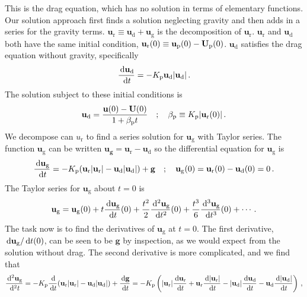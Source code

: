 This is the drag equation, which has no solution in terms of elementary functions. Our solution approach first finds a solution
neglecting gravity and then adds in a series for the gravity terms. $\mathbf{u}_\text{r} \equiv \mathbf{u}_\text{d} +
\mathbf{u}_\text{g}$ is the decomposition of $\mathbf{u}_\text{r}$. $\mathbf{u}_\text{r}$ and $\mathbf{u}_\text{d}$ both have the
same initial condition, $\mathbf{u}_\text{r}(0) \equiv \mathbf{u}_{\rm p}(0) - \mathbf{U}_{\rm p}(0)$. $\mathbf{u}_\text{d}$
satisfies the drag equation without gravity, specifically
\begin{align}
    \frac{\,\mathrm{d} \mathbf{u}_\text{d}}{\,\mathrm{d} t} = -K_{\rm p} \mathbf{u}_\text{d} |\mathbf{u}_\text{d}| \,.
\end{align}
The solution subject to these initial conditions is
\begin{align}
    \label{ud_exact}
    \mathbf{u}_\text{d} = \frac{\mathbf{u}(0) - \mathbf{U}(0)}{1 + \beta_{\rm p} t} \quad ; \quad \beta_{\rm p} \equiv K_{\rm p}
|\mathbf{u}_{\text{r}}(0)| \,.
\end{align}
We decompose can $u_\text{r}$ to find a series solution for $\mathbf{u}_\text{g}$ with Taylor series. The function
$\mathbf{u}_\text{g}$ can be written $\mathbf{u_g} = \mathbf{u}_\text{r} - \mathbf{u}_\text{d}$ so the differential equation for
$\mathbf{u}_\text{g}$ is
\begin{align}
    \frac{\,\mathrm{d} \mathbf{u}_\text{g}}{\,\mathrm{d} t} = -K_{\rm p} (\mathbf{u}_\text{r} |\mathbf{u}_\text{r}| - \mathbf{u}_\text{d}
|\mathbf{u}_\text{d}|) + \mathbf{g} \quad ; \quad \mathbf{u}_\text{g}(0) = \mathbf{u}_\text{r}(0) - \mathbf{u}_\text{d}(0) = 0 \,.
\end{align}
The Taylor series for $\mathbf{u}_\text{g}$ about $t = 0$ is
\begin{align}
    \mathbf{u}_\text{g} = \mathbf{u}_\text{g}(0) + t \frac{\,\mathrm{d} \mathbf{u}_\text{g}}{\,\mathrm{d} t}(0) + \frac{t^2}{2} \frac{\,\mathrm{d}^2
\mathbf{u}_\text{g}}{\,\mathrm{d} t^2}(0) + \frac{t^3}{6} \frac{\,\mathrm{d}^3 \mathbf{u}_\text{g}}{\,\mathrm{d} t^3}(0) + \cdots \,.
\end{align}
The task now is to find the derivatives of $\mathbf{u}_\text{g}$ at $t = 0$. The first derivative, $\,\mathrm{d} \mathbf{u}_\text{g} / \,\mathrm{d}
t(0)$, can be seen to be $\mathbf{g}$ by inspection, as we would expect from the solution without drag. The second derivative is
more complicated, and we find that
\begin{align*}
    \frac{\,\mathrm{d}^2 \mathbf{u}_\text{g}}{\,\mathrm{d}^2 t} = -K_{\rm p} \frac{\,\mathrm{d}}{\,\mathrm{d} t}(\mathbf{u}_\text{r} |\mathbf{u}_\text{r}| -
\mathbf{u}_\text{d} |\mathbf{u}_\text{d}|) + \frac{\,\mathrm{d} \mathbf{g}}{\,\mathrm{d} t} = -K_{\rm p} \left(|\mathbf{u}_\text{r}| \frac{\,\mathrm{d}
\mathbf{u}_\text{r}}{\,\mathrm{d} t} + \mathbf{u}_\text{r} \frac{\,\mathrm{d} |\mathbf{u}_\text{r}|}{\,\mathrm{d} t} - |\mathbf{u}_\text{d}| \frac{\,\mathrm{d}
\mathbf{u}_\text{d}}{\,\mathrm{d} t} - \mathbf{u}_\text{d} \frac{\,\mathrm{d} |\mathbf{u}_\text{d}|}{\,\mathrm{d} t}\right) \,,
\end{align*}
